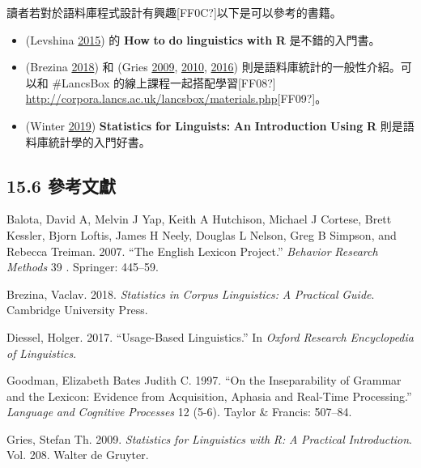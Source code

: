 讀者若對於語料庫程式設計有興趣[FF0C?]以下是可以參考的書籍。

\begin{itemize}
\item (Levshina \hyperlink{bookmarkid3tbugp1}{2015}) 的 \textbf{How} \textbf{to} \textbf{do} \textbf{linguistics} \textbf{with} \textbf{R} 是不錯的入門書。

\item (Brezina \hyperlink{bookmarkid41mghml}{2018}) 和 (Gries \hyperlink{bookmarkid3fwokq0}{2009}, \hyperlink{bookmarkid1v1yuxt}{2010}, \hyperlink{bookmarkid4f1mdlm}{2016}) 則是語料庫統計的一般性介紹。可以和 \#LancsBox 的線上課程一起搭配學習[FF08?] \url{http://corpora.lancs.ac.uk/lancsbox/materials.php}[FF09?]。

\item (Winter \hyperlink{bookmarkid46r0co2}{2019}) \textbf{Statistics} \textbf{for} \textbf{Linguists:} \textbf{An} \textbf{Introduction} \textbf{Using} \textbf{R} 則是語料庫統計學的入門好書。

\end{itemize}
\subsection{15.6 參考文獻}

\hypertarget{bookmarkid32hioqz}{}Balota, David A, Melvin J Yap, Keith A Hutchison, Michael J Cortese, Brett Kessler,   Bjorn Loftis, James H Neely, Douglas L Nelson, Greg B Simpson, and Rebecca Treiman. 2007. “The English Lexicon Project.” \textit{Behavior} \textit{Research} \textit{Methods} 39 . Springer: 445–59.

\hypertarget{bookmarkid41mghml}{}Brezina, Vaclav. 2018. \textit{Statistics} \textit{in} \textit{Corpus} \textit{Linguistics:} \textit{A} \textit{Practical} \textit{Guide}. Cambridge University Press.

\hypertarget{bookmarkid2grqrue}{}Diessel, Holger. 2017. “Usage-Based Linguistics.” In \textit{Oxford} \textit{Research} \textit{Encyclopedia} \textit{of} \textit{Linguistics}.

\hypertarget{bookmarkidvx1227}{}Goodman, Elizabeth Bates Judith C. 1997. “On the Inseparability of Grammar and the Lexicon: Evidence from Acquisition, Aphasia and Real-Time Processing.” \textit{Language} \textit{and} \textit{Cognitive} \textit{Processes} 12 (5-6). Taylor \& Francis: 507–84.

\hypertarget{bookmarkid3fwokq0}{}Gries, Stefan Th. 2009. \textit{Statistics} \textit{for} \textit{Linguistics} \textit{with} \textit{R:} \textit{A} \textit{Practical} \textit{Introduction}. Vol. 208. Walter de Gruyter.

